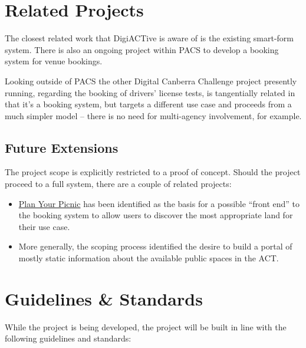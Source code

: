 \documentclass[12pt,a4paper,twosided]{article}
\begin{document}
\section{Related Projects}

The closest related work that DigiACTive is aware of is the existing
smart-form system. There is also an ongoing project within PACS to
develop a booking system for venue bookings.

Looking outside of PACS the other Digital Canberra Challenge project
presently running, regarding the booking of drivers' license tests, is
tangentially related in that it's a booking system, but targets a
different use case and proceeds from a much simpler model -- there is no
need for multi-agency involvement, for example.

\subsection{Future Extensions}

The project scope is explicitly restricted to a proof of concept. Should
the project proceed to a full system, there are a couple of related
projects:

\begin{itemize}
\itemsep1pt\parskip0pt
\item
  \href{http://planyourpicnic.org.au}{Plan Your Picnic} has been
  identified as the basis for a possible ``front end'' to the booking
  system to allow users to discover the most appropriate land for their
  use case.
\item
  More generally, the scoping process identified the desire to build a
  portal of mostly static information about the available public spaces
  in the ACT.
\end{itemize}

\section{Guidelines \& Standards}

While the project is being developed, the project will be built in line
with the following guidelines and standards:
\end{document}
